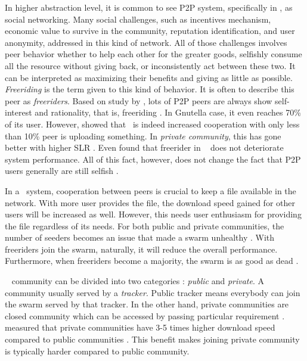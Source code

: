 In higher abstraction level, it is common to see P2P system, specifically in \bt, as social networking. Many social challenges, such as incentives mechanism, economic value to survive in the community, reputation identification, and user anonymity, addressed in this kind of network. All of those challenges involves peer behavior whether to help each other for the greater goods, selfishly consume all the resource without giving back, or inconsistently act between these two. It can be interpreted as maximizing their benefits and giving as little as possible. \textit{Freeriding} is the term given to this kind of behavior. It is often to describe this peer as \textit{freeriders}. Based on study by \citeauthor{2000:freeridegnutella:adar}, lots of P2P peers are always show self-interest and rationality, that is, freeriding \cite{2000:freeridegnutella:adar}. In Gnutella case, it even reaches 70\% of its user.  However, \citeauthor{2005:bittorrentcooperation:andrade} showed that \bt~is indeed increased cooperation with only less than 10\% peer is uploading something. In \textit{private community}, this has gone better with higher SLR \cite{2005:bittorrentcooperation:andrade}. Even \citeauthor{2015:freeriderinbtcommunity:das} found that freerider in \bt~ does not deteriorate system performance\cite{2015:freeriderinbtcommunity:das}. All of this fact, however, does not change the fact that P2P users generally are still selfish \cite{2014:userbehaviourprivate:jia}. 

In a \bt~system, cooperation between peers is crucial to keep a file available in the network. With more user provides the file, the download speed gained for other users will be increased as well. However, this needs user enthusiasm for providing the file regardless of its needs. For both public and private communities, the number of seeders becomes an issue that made a swarm unhealthy \cite{2010:pubpriv:meulpolder, 2014:sustainabilitytorrent:chen}. With freeriders join the swarm, naturally, it will reduce the overall performance. Furthermore, when freeriders become a majority, the swarm is as good as dead \cite{2000:freeridegnutella:adar}. 

\bt~ community can be divided into two categories : \textit{public} and \textit{private}. A community usually served by a \textit{tracker}. Public tracker means everybody can join the swarm served by that tracker. In the other hand, private communities are closed community which can be accessed by passing particular requirement \cite{2010:pubpriv:meulpolder, 2014:sustainabilitytorrent:chen}. \citeauthor{2010:pubpriv:meulpolder} measured that private communities have 3-5 times higher download speed compared to public communities \cite{2010:pubpriv:meulpolder}. This benefit makes joining private community is typically harder compared to public community.

